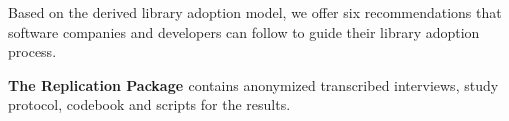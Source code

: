 \documentclass[sigconf,review,anonymous, table]{acmart}
\def\bf{\textbf}
\newcommand{\nd}{\vspace{1mm}\noindent}
\newcommand{\todo}[1]{{\color{red}{\textbf{#1}}}}
\newcounter{recommendation}[section]
\begin{document}
Based on the derived library adoption model, we offer six recommendations that software companies and developers can follow to guide their library adoption process. 




\nd\bf{The Replication Package \cite{website:replication-package}} contains anonymized transcribed interviews, study protocol, codebook and scripts for the results.
\end{document}
